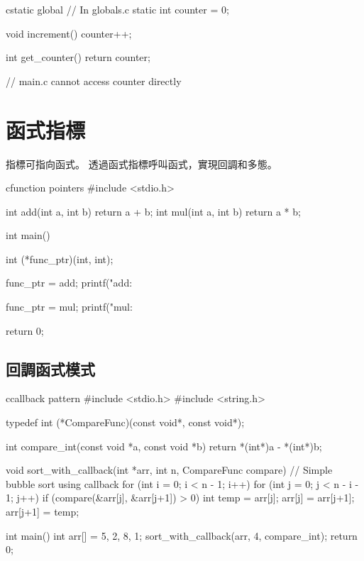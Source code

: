 \begin{code}{c}{static global}
// In globals.c
static int counter = 0;

void increment() {
    counter++;
}

int get_counter() {
    return counter;
}

// main.c cannot access counter directly
\end{code}


\section{函式指標}

指標可指向函式。 透過函式指標呼叫函式，實現回調和多態。

\begin{code}{c}{function pointers}
#include <stdio.h>

int add(int a, int b) { return a + b; }
int mul(int a, int b) { return a * b; }

int main() {
    int (*func_ptr)(int, int);

    func_ptr = add;
    printf("add: %

    func_ptr = mul;
    printf("mul: %

    return 0;
}
\end{code}

\subsection*{回調函式模式}

\begin{code}{c}{callback pattern}
#include <stdio.h>
#include <string.h>

typedef int (*CompareFunc)(const void*, const void*);

int compare_int(const void *a, const void *b) {
    return *(int*)a - *(int*)b;
}

void sort_with_callback(int *arr, int n,
                       CompareFunc compare) {
    // Simple bubble sort using callback
    for (int i = 0; i < n - 1; i++) {
        for (int j = 0; j < n - i - 1; j++) {
            if (compare(&arr[j], &arr[j+1]) > 0) {
                int temp = arr[j];
                arr[j] = arr[j+1];
                arr[j+1] = temp;
            }
        }
    }
}

int main() {
    int arr[] = {5, 2, 8, 1};
    sort_with_callback(arr, 4, compare_int);
    return 0;
}
\end{code}

